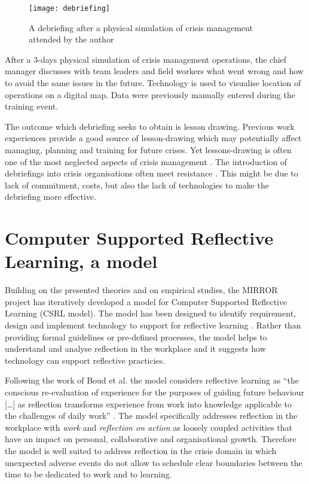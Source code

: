 \begin{figure}
	[tbh] \centering 
	\texttt{[image: debriefing]} \caption{A debriefing after a physical simulation of crisis management attended by the author} \label{fig:debriefing-example} 
\end{figure}

After a 3-days physical simulation of crisis management operations, the chief manager discusses with team leaders and field workers what went wrong and how to avoid the same issues in the future. Technology is used to visualise location of operations on a digital map. Data were previously manually entered during the training event.

The outcome which debriefing seeks to obtain is lesson drawing. Previous work experiences provide a good source of lesson-drawing which may potentially affect managing, planning and training for future crises. Yet lessons-drawing is often one of the most neglected aspects of crisis management \autocites{Lagadec:1997js}{Stern:1997eb}. The introduction of debriefings into crisis organisations often meet resistance \autocite{Lagadec:1997js}. This might be due to lack of commitment, costs, but also the lack of technologies to make the debriefing more effective.

\section{Computer Supported Reflective Learning, a model}\label{computer-supported-reflective-learning-a-model}

Building on the presented theories and on empirical studies, the MIRROR project has iteratively developed a model for Computer Supported Reflective Learning (CSRL model). The model has been designed to identify requirement, design and implement technology to support for reflective learning \autocite{Krogstie:2013kf}. Rather than providing formal guidelines or pre-defined processes, the model helps to understand and analyse reflection in the workplace and it suggests how technology can support reflective practicies.

Following the work of Boud et al. \autocite*{boud1985reflection} the model considers reflective learning as ``the conscious re-evaluation of experience for the purposes of guiding future behaviour {[}\ldots{}{]} as reflection transforms experience from work into knowledge applicable to the challenges of daily work'' \autocite{Krogstie:2013kf}. The model specifically addresses reflection in the workplace with \emph{work} and \emph{reflection on action} as loosely coupled activities that have an impact on personal, collaborative and organisational growth. Therefore the model is well suited to address reflection in the crisis domain in which unexpected adverse events do not allow to schedule clear boundaries between the time to be dedicated to work and to learning.

